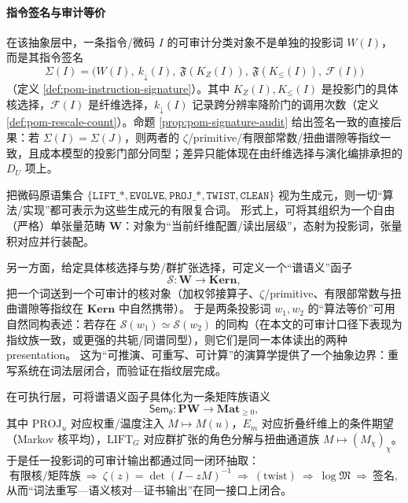 \paragraph{指令签名与审计等价}
在该抽象层中，一条指令/微码 $I$ 的可审计分类对象不是单独的投影词 $W(I)$，而是其指令签名
$$
\Sigma(I)=\bigl(W(I),\ k_{\downarrow}(I),\ \mathfrak{F}(K_Z(I)),\ \mathfrak{F}(K_{\le}(I)),\ \mathcal{F}(I)\bigr)
$$
（定义 \ref{def:pom-instruction-signature}）。其中 $K_Z(I),K_{\le}(I)$ 是投影门的具体核选择，$\mathcal{F}(I)$ 是纤维选择，$k_{\downarrow}(I)$ 记录跨分辨率降阶门的调用次数（定义 \ref{def:pom-rescale-count}）。命题 \ref{prop:pom-signature-audit} 给出签名一致的直接后果：若 $\Sigma(I)=\Sigma(J)$，则两者的 $\zeta$/primitive/有限部常数/扭曲谱隙等指纹一致，且成本模型的投影门部分同型；差异只能体现在由纤维选择与演化编排承担的 $D_U$ 项上。

\begin{remark}[投影词范畴与“算法等价 = 自然同构”的口径]\label{rem:pom-word-category}
把微码原语集合
\(
\{\texttt{LIFT\_*},\texttt{EVOLVE},\texttt{PROJ\_*},\texttt{TWIST},\texttt{CLEAN}\}
\)
视为生成元，则一切“算法/实现”都可表示为这些生成元的有限复合词。
形式上，可将其组织为一个自由（严格）单张量范畴 \(\mathbf{W}\)：对象为“当前纤维配置/读出层级”，态射为投影词，张量积对应并行装配。

另一方面，给定具体核选择与势/群扩张选择，可定义一个“谱语义”函子
\[
\mathcal{S}:\mathbf{W}\to \mathbf{Kern},
\]
把一个词送到一个可审计的核对象（加权邻接算子、\(\zeta\)/primitive、有限部常数与扭曲谱隙等指纹在 \(\mathbf{Kern}\) 中自然携带）。
于是两条投影词 \(w_1,w_2\) 的“算法等价”可用自然同构表述：若存在 \(\mathcal{S}(w_1)\simeq \mathcal{S}(w_2)\) 的同构（在本文的可审计口径下表现为指纹族一致，或更强的共轭/同谱同型），则它们是同一本体读出的两种 presentation。
这为“可推演、可重写、可计算”的演算学提供了一个抽象边界：重写系统在词法层闭合，而验证在指纹层完成。
\end{remark}

\begin{remark}\label{rem:pom-sem-functor-loop}
在可执行层，可将谱语义函子具体化为一条矩阵族语义
\[
\mathsf{Sem}_\theta:\mathbf{PW}\to \mathbf{Mat}_{\ge 0},
\]
其中 \(\mathrm{PROJ}_u\) 对应权重/温度注入 \(M\mapsto M(u)\)，\(E_m\) 对应折叠纤维上的条件期望（Markov 核平均），\(\mathrm{LIFT}_G\) 对应群扩张的角色分解与扭曲通道族 \(M\mapsto (M_\chi)_\chi\)。
于是任一投影词的可审计输出都通过同一闭环抽取：
\[
\text{有限核/矩阵族}\ \Rightarrow\ \zeta(z)=\det(I-zM)^{-1}\ \Rightarrow\ (\text{twist})\ \Rightarrow\ \log\mathfrak{M}\ \Rightarrow\ \text{签名},
\]
从而“词法重写—语义核对—证书输出”在同一接口上闭合。
\end{remark}

